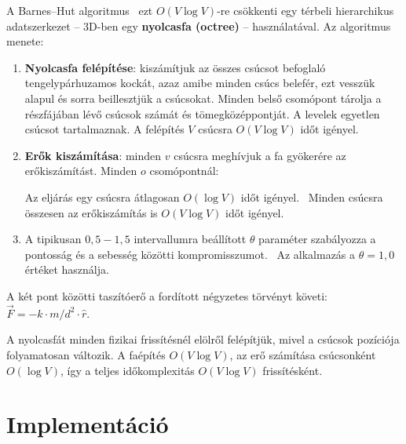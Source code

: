 A Barnes–Hut algoritmus~\cite{barneshut1986,barneshut_princeton} ezt $O(V \log V)$-re csökkenti egy térbeli hierarchikus adatszerkezet – 3D-ben egy \textbf{nyolcasfa (octree)} – használatával. Az algoritmus menete:

\begin{enumerate}
\item \textbf{Nyolcasfa felépítése}: kiszámítjuk az összes csúcsot befoglaló tengelypárhuzamos kockát, azaz amibe minden csúcs belefér, ezt vesszük alapul és sorra beillesztjük a csúcsokat. Minden belső csomópont tárolja a részfájában lévő csúcsok számát és tömegközéppontját. A levelek egyetlen csúcsot tartalmaznak. A felépítés $V$ csúcsra $O(V \log V)$ időt igényel.\cite{barneshut1986}
\item \textbf{Erők kiszámítása}: minden $v$ csúcsra meghívjuk a fa gyökerére az erőkiszámítást. Minden $o$ csomópontnál:
    Az eljárás egy csúcsra átlagosan $O(\log V)$ időt igényel.~\cite{barneshut1986} Minden csúcsra összesen az erőkiszámítás is $O(V \log V)$ időt igényel.
\item A tipikusan $0{,}5 - 1{,}5$ intervallumra beállított $\theta$ paraméter szabályozza a pontosság és a sebesség közötti kompromisszumot.~\cite{barneshut1986} Az alkalmazás a $\theta = 1{,}0$ értéket használja.
\end{enumerate}

A két pont közötti taszítóerő a fordított négyzetes törvényt követi: $\vec{F} = -k \cdot m / d^2 \cdot \hat{r}$.

A nyolcasfát minden fizikai frissítésnél elölről felépítjük, mivel a csúcsok pozíciója folyamatosan változik. A faépítés $O(V \log V)$, az erő számítása csúcsonként $O(\log V)$, így a teljes időkomplexitás $O(V \log V)$ frissítésként.

\section{Implementáció}

